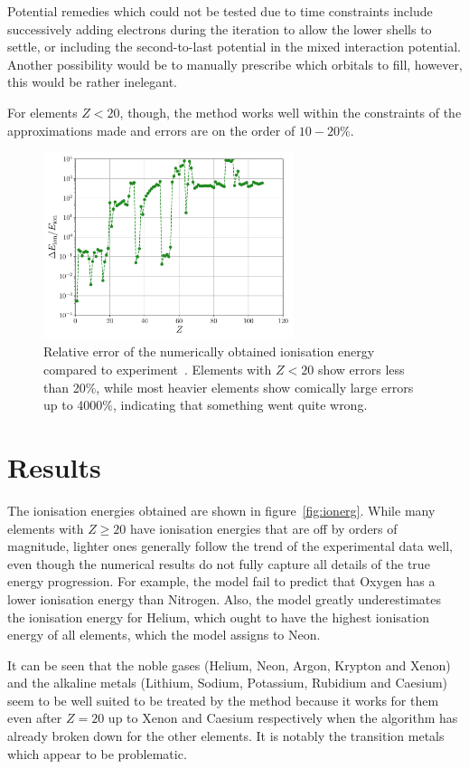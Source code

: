 \documentclass[a4paper,DIV=12,english]{scrartcl}
\begin{document}
Potential remedies which could not be tested due to time constraints include successively adding electrons during the iteration to allow the lower shells to settle, or including the second-to-last potential in the mixed interaction potential. Another possibility would be to manually prescribe which orbitals to fill, however, this would be rather inelegant.

For elements $Z<20$, though, the method works well within the constraints of the approximations made and errors are on the order of $10-20\%$.
\begin{figure}
    \centering
    \includegraphics[width=0.65\textwidth]{../plots/ionerg_err.pdf}
    \caption{Relative error of the numerically obtained ionisation energy compared to experiment~\cite{NIST_ASD}. Elements with $Z<20$ show errors less than 20\%, while most heavier elements show comically large errors up to 4000\%, indicating that something went quite wrong.}
    \label{fig:ionergerr}
\end{figure}

\FloatBarrier
\section{Results}
The ionisation energies obtained are shown in figure~\ref{fig:ionerg}. While many elements with $Z\geq20$ have ionisation energies that are off by orders of magnitude, lighter ones generally follow the trend of the experimental data well, even though the numerical results do not fully capture all details of the true energy progression. For example, the model fail to predict that Oxygen has a lower ionisation energy than Nitrogen. Also, the model greatly underestimates the ionisation energy for Helium, which ought to have the highest ionisation energy of all elements, which the model assigns to Neon.

It can be seen that the noble gases (Helium, Neon, Argon, Krypton and Xenon) and the alkaline metals (Lithium, Sodium, Potassium, Rubidium and Caesium) seem to be well suited to be treated by the method because it works for them even after $Z=20$ up to Xenon and Caesium respectively when the algorithm has already broken down for the other elements. It is notably the transition metals which appear to be problematic.
\end{document}

